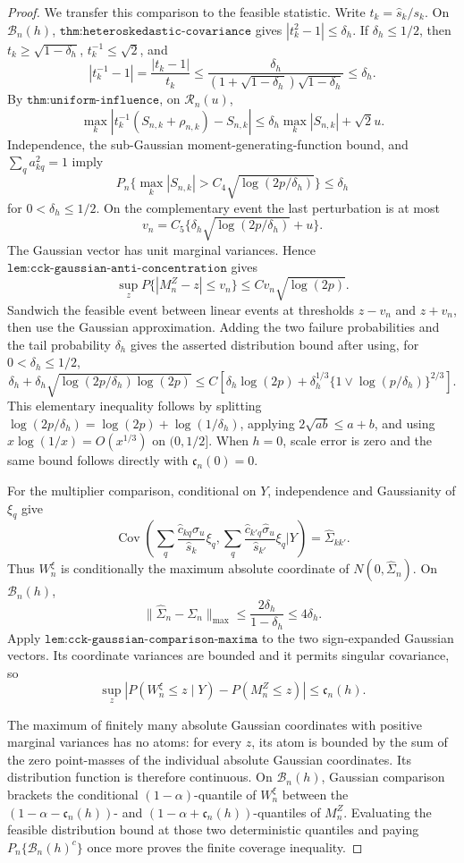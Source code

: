 \documentclass{article}
\begin{document}
\begin{proof}
We transfer this comparison to the feasible statistic.  Write
\(t_k=\widehat s_k/s_k\).  On \(\mathcal B_n(h)\),
\(\texttt{thm:heteroskedastic-covariance}\) gives
\(|t_k^2-1|\le\delta_h\).  If \(\delta_h\le1/2\), then
\(t_k\ge\sqrt{1-\delta_h}\), \(t_k^{-1}\le\sqrt2\), and
\[
 |t_k^{-1}-1|
 =\frac{|t_k-1|}{t_k}
 \le\frac{\delta_h}
 {(1+\sqrt{1-\delta_h})\sqrt{1-\delta_h}}
 \le\delta_h.
\]
By \(\texttt{thm:uniform-influence}\), on \(\mathcal R_n(u)\),
\[
 \max_k\left|t_k^{-1}(S_{n,k}+\rho_{n,k})-S_{n,k}\right|
 \le\delta_h\max_k|S_{n,k}|+\sqrt2u.
\]
Independence, the sub-Gaussian moment-generating-function bound, and
\(\sum_qa_{kq}^2=1\) imply
\[
 P_n\{\max_k|S_{n,k}|>C_4\sqrt{\log(2p/\delta_h)}\}
 \le\delta_h
\]
for \(0<\delta_h\le1/2\).  On the complementary event the last
perturbation is at most
\[
 v_n=C_5\{\delta_h\sqrt{\log(2p/\delta_h)}+u\}.
\]
The Gaussian vector has unit marginal variances.  Hence
\(\texttt{lem:cck-gaussian-anti-concentration}\) gives
\[
 \sup_zP\{|M_n^Z-z|\le v_n\}
 \le Cv_n\sqrt{\log(2p)}.
\]
Sandwich the feasible event between linear events at thresholds
\(z-v_n\) and \(z+v_n\), then use the Gaussian approximation.  Adding
the two failure probabilities and the tail probability \(\delta_h\)
gives the asserted distribution bound after using, for
\(0<\delta_h\le1/2\),
\[
 \delta_h+
 \delta_h\sqrt{\log(2p/\delta_h)\log(2p)}
 \le C\left[\delta_h\log(2p)+
 \delta_h^{1/3}\{1\vee\log(p/\delta_h)\}^{2/3}\right].
\]
This elementary inequality follows by splitting
\(\log(2p/\delta_h)=\log(2p)+\log(1/\delta_h)\), applying
\(2\sqrt{ab}\le a+b\), and using
\(x\log(1/x)=O(x^{1/3})\) on \((0,1/2]\).  When \(h=0\), scale error
is zero and the same bound follows directly with
\(\mathfrak c_n(0)=0\).

For the multiplier comparison, conditional on \(Y\), independence and
Gaussianity of \(\xi_q\) give
\[
 \operatorname{Cov}\!\left(
 \sum_q\frac{\widehat c_{kq}\widehat\sigma_u}{\widehat s_k}\xi_q,
 \sum_q\frac{\widehat c_{k'q}\widehat\sigma_u}{\widehat s_{k'}}\xi_q
 \mathrel{\Big|}Y\right)=\widehat\Sigma_{kk'}.
\]
Thus \(W_n^\xi\) is conditionally the maximum absolute coordinate of
\(N(0,\widehat\Sigma_n)\).  On \(\mathcal B_n(h)\),
\[
 \|\widehat\Sigma_n-\Sigma_n\|_{\max}
 \le\frac{2\delta_h}{1-\delta_h}\le4\delta_h.
\]
Apply \(\texttt{lem:cck-gaussian-comparison-maxima}\) to the two
sign-expanded Gaussian vectors.  Its coordinate variances are bounded
and it permits singular covariance, so
\[
 \sup_z|P(W_n^\xi\le z\mid Y)-P(M_n^Z\le z)|
 \le\mathfrak c_n(h).
\]

The maximum of finitely many absolute Gaussian coordinates with positive
marginal variances has no atoms: for every \(z\), its atom is bounded by
the sum of the zero point-masses of the individual absolute Gaussian
coordinates.  Its distribution function is therefore continuous.  On
\(\mathcal B_n(h)\), Gaussian comparison brackets the conditional
\((1-\alpha)\)-quantile of \(W_n^\xi\) between the
\((1-\alpha-\mathfrak c_n(h))\)- and
\((1-\alpha+\mathfrak c_n(h))\)-quantiles of \(M_n^Z\).  Evaluating the
feasible distribution bound at those two deterministic quantiles and
paying \(P_n\{\mathcal B_n(h)^c\}\) once more proves the finite coverage
inequality.


\end{proof}
\end{document}
